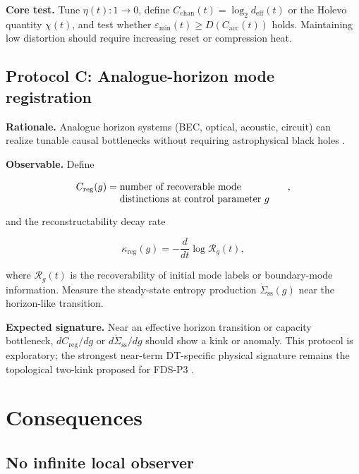 \documentclass[10pt,a4paper,twocolumn,aps,prl]{revtex4-2}
\begin{document}
\textbf{Core test.} Tune $\eta(t):1\to0$, define $C_{\mathrm{chan}}(t)=\log_2 d_{\mathrm{eff}}(t)$ or the Holevo quantity $\chi(t)$, and test whether $\varepsilon_{\min}(t)\geq D(C_{\mathrm{acc}}(t))$ holds. Maintaining low distortion should require increasing reset or compression heat.

\subsection{Protocol C: Analogue-horizon mode registration}

\textbf{Rationale.} Analogue horizon systems (BEC, optical, acoustic, circuit) can realize tunable causal bottlenecks without requiring astrophysical black holes \cite{bousso2002}.

\textbf{Observable.} Define

\begin{equation}
C_{\mathrm{reg}}(g)
=
\parbox[t]{6cm}{\raggedright number of recoverable mode distinctions at control parameter $g$},
\end{equation}

and the reconstructability decay rate

\begin{equation}
\kappa_{\mathrm{reg}}(g)
=
-\frac{d}{dt}\log\mathcal{R}_g(t),
\end{equation}

where $\mathcal{R}_g(t)$ is the recoverability of initial mode labels or boundary-mode information. Measure the steady-state entropy production $\dot\Sigma_{\mathrm{ss}}(g)$ near the horizon-like transition.

\textbf{Expected signature.} Near an effective horizon transition or capacity bottleneck, $dC_{\mathrm{reg}}/dg$ or $d\dot\Sigma_{\mathrm{ss}}/dg$ should show a kink or anomaly. This protocol is exploratory; the strongest near-term DT-specific physical signature remains the topological two-kink proposed for FDS-P3 \cite{wuphysicalregistry2026}.

\section{Consequences}

\subsection{No infinite local observer}
\end{document}
